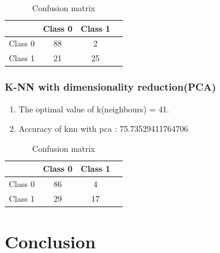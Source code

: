 \documentclass[12pt]{article}
\begin{document}
\begin{table}[h]
\begin{center}
\begin{tabular}{|c|c|c|c|}
\hline
 \textbf{} & {Class 0} & {Class 1}\\\hline
Class 0  & 88 & 2\\\hline
Class 1  & 21 & 25\\\hline
\end{tabular}
\end{center}
\caption{Confusion matrix}
\end{table}

\subsubsection{K-NN with dimensionality reduction(PCA)}
\begin{enumerate}
\item The optimal value of k(neighbours) = 41.
\item Accuracy of knn with pca : 75.73529411764706
\end{enumerate}

\begin{table}[h]
\begin{center}
\begin{tabular}{|c|c|c|c|}
\hline
 \textbf{} & {Class 0} & {Class 1}\\\hline
Class 0  & 86 & 4\\\hline
Class 1  &29 & 17\\\hline
\end{tabular}
\end{center}
\caption{Confusion matrix}
\end{table}

\section{Conclusion}
\end{document}
